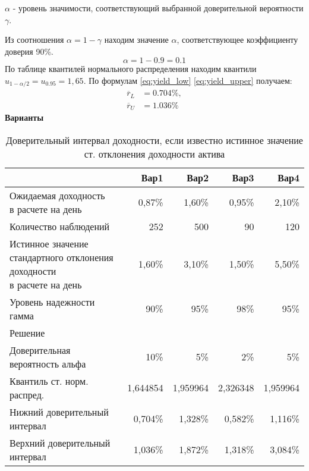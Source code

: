 \documentclass[12pt,a4paper]{article}
\begin{document}
\begin{taskrus}
$\alpha$ - уровень значимости, соответствующий выбранной доверительной вероятности $\gamma$.

Из соотношения $\alpha=1-\gamma$ находим значение $\alpha$, соответствующее коэффициенту доверия 90\%.
$$\alpha=1-0.9=0.1$$
По таблице квантилей нормального распределения находим квантили $u_{1-\alpha/2}=u_{0.95}=1,65$.
По формулам \eqref{eq:yield_low} \eqref{eq:yield_upper} получаем:
\begin{align*}
\overline{r}_L&=0.704\%, \\
\overline{r}_U&=1.036\%
\end{align*}
\textbf{Варианты}
\begin{table}[H]
  \centering
  \caption{Доверительный интервал доходности, если известно истинное значение ст. отклонения доходности актива}
    \begin{tabular}{lrrrr}
    \toprule
          & Вар1  & Вар2  & Вар3  & Вар4 \\
    \midrule
    \specialcell{Ожидаемая доходность\\в расчете на день } & 0,87\% & 1,60\% & 0,95\% & 2,10\% \\
    Количество наблюдений & 252   & 500   & 90    & 120 \\
    \specialcell{Истинное значение\\стандартного отклонения доходности\\в расчете на день} & 1,60\% & 3,10\% & 1,50\% & 5,50\% \\
    Уровень надежности гамма & 90\%  & 95\%  & 98\%  & 95\% \\
    \midrule
    Решение &       &       &       &  \\
    \midrule
    Доверительная вероятность альфа & 10\%  & 5\%   & 2\%   & 5\% \\
    Квантиль ст. норм. распред. & 1,644854 & 1,959964 & 2,326348 & 1,959964 \\
    Нижний доверительный интервал & 0,704\% & 1,328\% & 0,582\% & 1,116\% \\
    Верхний доверительный интервал & 1,036\% & 1,872\% & 1,318\% & 3,084\% \\
    \bottomrule
    \end{tabular}%
  \label{tab:addlabel}%
\end{table}%

\end{taskrus}
\end{document}
